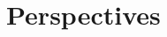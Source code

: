 \documentclass[compress,red]{beamer}
\begin{document}

\section{Perspectives}

\subsection*{} %
\end{document}
